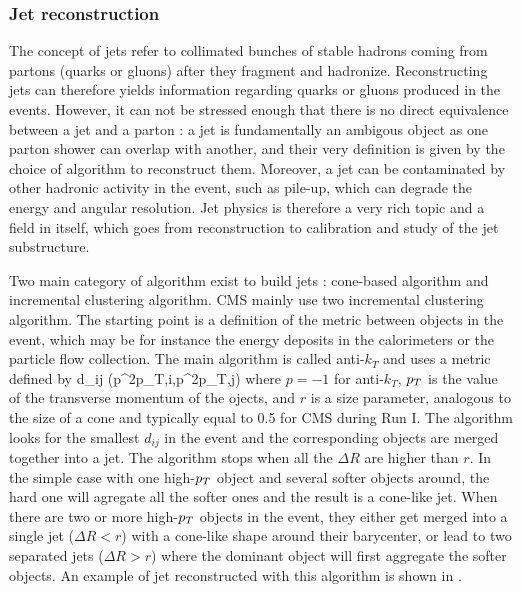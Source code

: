 
            \subsubsection{Jet reconstruction}

        The concept of jets refer to collimated bunches of stable hadrons coming from partons
        (quarks or gluons) after they fragment and hadronize. Reconstructing jets can
        therefore yields information regarding quarks or gluons produced in the events.
        However, it can not be stressed enough that there is no direct equivalence between
        a jet and a parton : a jet is fundamentally an ambigous object as one parton
        shower can overlap with another, and their very definition is given by the choice
        of algorithm to reconstruct them. Moreover, a jet can be contaminated by other
        hadronic activity in the event, such as pile-up, which can degrade the energy
        and angular resolution. Jet physics is therefore a very rich topic and a field
        in itself, which goes from reconstruction to calibration and study of the jet
        substructure.

        Two main category of algorithm exist to build jets : cone-based algorithm and
        incremental clustering algorithm. CMS mainly use two incremental clustering
        algorithm. The starting point is a definition of the metric between objects in the
        event, which may be for instance the energy deposits in the calorimeters or the
        particle flow collection. The main algorithm is called anti-$k_T$ and uses a metric
        defined by
        {
            d_{ij}  {}(p^{2p}_{T,i},p^{2p}_{T,j}) 
        }
        where $p = -1$ for anti-$k_T$, $p_T$ is the value of the transverse momentum of
        the ojects, and $r$ is a size parameter, analogous to the size of a cone and
        typically equal to 0.5 for CMS during Run I. The algorithm looks for the smallest
        $d_{ij}$ in the event and the corresponding objects are merged together into a
        jet. The algorithm stops when all the $\Delta R$ are higher than $r$. In the
        simple case with one high-$p_T$ object and several softer objects around, the
        hard one will agregate all the softer ones and the result is a cone-like jet. When
        there are two or more high-$p_T$ objects in the event, they either get merged into
        a single jet ($\Delta R < r$) with a cone-like shape around their barycenter, or
        lead to two separated jets ($\Delta R > r$) where the dominant object will first
        aggregate the softer objects. An example of jet reconstructed with this algorithm
        is shown in .

